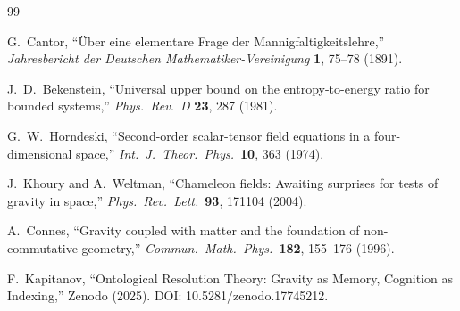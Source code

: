 \documentclass[12pt, a4paper]{article}
\begin{document}
\newpage
\begin{thebibliography}{99}

G.~Cantor,
``\"Uber eine elementare Frage der Mannigfaltigkeitslehre,''
\textit{Jahresbericht der Deutschen Mathematiker-Vereinigung} \textbf{1}, 75--78 (1891).

J.~D.~Bekenstein,
``Universal upper bound on the entropy-to-energy ratio for bounded systems,''
\textit{Phys.\ Rev.\ D} \textbf{23}, 287 (1981).

G.~W.~Horndeski,
``Second-order scalar-tensor field equations in a four-dimensional space,''
\textit{Int.\ J.\ Theor.\ Phys.}\ \textbf{10}, 363 (1974).

J.~Khoury and A.~Weltman,
``Chameleon fields: Awaiting surprises for tests of gravity in space,''
\textit{Phys.\ Rev.\ Lett.}\ \textbf{93}, 171104 (2004).

A.~Connes,
``Gravity coupled with matter and the foundation of non-commutative geometry,''
\textit{Commun.\ Math.\ Phys.}\ \textbf{182}, 155--176 (1996).

F.~Kapitanov,
``Ontological Resolution Theory: Gravity as Memory, Cognition as Indexing,''
Zenodo (2025). DOI: 10.5281/zenodo.17745212.

\end{thebibliography}
\end{document}
